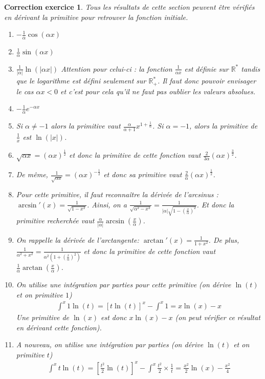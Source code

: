 \documentclass[12pt]{article}
\newtheorem{correction}{\bf Correction exercice}
\newenvironment{cor}{
\begin{correction}\smallskip\normalfont}{\end{correction}
}
\newcommand*{\R}{\mathbb{R}}
\newif\ifcorrige\corrigefalse
\begin{document}
\ifcorrige
\color{magenta}
\begin{cor}
Tous les r\'esultats de cette section peuvent \^etre v\'erifi\'es en d\'erivant la primitive
pour retrouver la fonction initiale.
\begin{enumerate}
\item $- \frac{1}{\alpha} \cos(\alpha x)$
\item $\frac{1}{\alpha} \sin(\alpha x)$
\item $\frac{1}{|\alpha|} \ln(|\alpha x|)$
  Attention pour celui-ci : la fonction $\frac{1}{\alpha x}$ est d\'efinie sur $\R^*$
  tandis que le logarithme est d\'efini seulement sur $\R_+^*$.
  Il faut donc pouvoir envisager le cas $\alpha x<0$ et c'est pour cela qu'il ne faut pas oublier les valeurs
  absolues.
\item $- \frac{1}{\alpha}e^{-\alpha x}$
\item Si $\alpha \neq -1$ alors la primitive vaut $\frac{\alpha}{\alpha+1} x^{1+\frac{1}{\alpha}}$.
  Si $\alpha = -1$, alors la primitive de $\frac{1}{x}$ est $\ln(|x|)$.
\item $\sqrt{\alpha x} = (\alpha x)^{\frac12}$ et donc la primitive de cette fonction vaut
  $\frac2{3\alpha} (\alpha x)^{\frac32}$.
\item De m\^eme, $\frac{1}{\sqrt{\alpha x}} = (\alpha x)^{-\frac12}$
  et donc sa primitive vaut
  $\frac{2}{\alpha}(\alpha x)^{\frac12}$.
\item Pour cette primitive, il faut reconna\^itre la d\'eriv\'ee de l'arcsinus :
  $\arcsin'(x) = \frac{1}{\sqrt{1-x^2}}$.
  Ainsi, on a $\frac{1}{\sqrt{\alpha^2-x^2}} = \frac{1}{|\alpha|\sqrt{1-(\frac{x}{\alpha})^2}}$.
  Et donc la primitive recherch\'ee vaut
  $\frac{\alpha}{|\alpha|}\arcsin(\frac{x}{\alpha})$.
\item On rappelle la d\'eriv\'ee de l'arctangente: $\arctan'(x) = \frac{1}{1+x^2}$.
  De plus, $\frac{1}{\alpha^2 + x^2} = \frac{1}{\alpha^2(1 + (\frac{x}{\alpha})^2)}$
  et donc la primitive de cette fonction vaut
  $\frac{1}{\alpha}\arctan(\frac{x}{\alpha})$.
\item On utilise une int\'egration par parties pour cette primitive (on d\'erive $\ln(t)$ et on primitive $1$)
  \begin{align*}
    \int^x 1 \ln(t) = [t \ln(t)]^x - \int^x 1 = x \ln(x) - x
  \end{align*}
  Une primitive de $\ln(x)$ est donc $x \ln(x) - x$
  (on peut v\'erifier ce r\'esultat en d\'erivant cette fonction).

\item A nouveau, on utilise une int\'egration par parties
  (on d\'erive $\ln(t)$ et on primitive $t$)
  \begin{align*}
    \int^x t \ln(t) = [\frac{t^2}{2} \ln(t)]^x - \int^x \frac{t^2}{2} \times \frac{1}{t}
    = \frac{x^2}{2} \ln(x) - \frac{x^2}{4}
  \end{align*}


\end{enumerate}
\end{cor}
\end{document}
